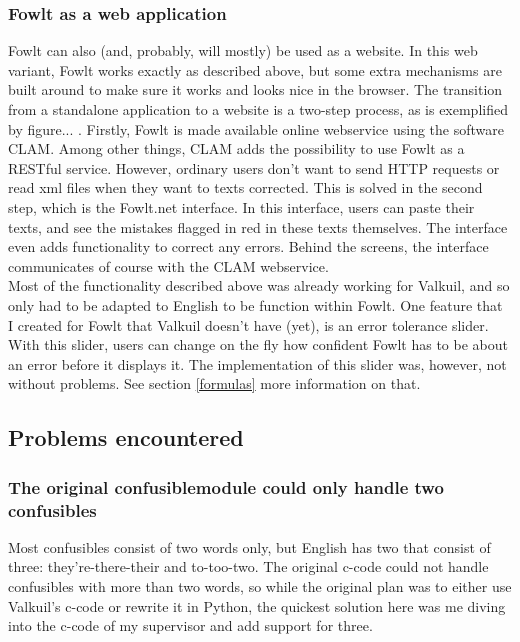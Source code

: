 \documentclass[12pt]{article}
\begin{document}
\subsubsection{Fowlt as a web application}
Fowlt can also (and, probably, will mostly) be used as a website. In this web variant, Fowlt works exactly as described above, but some extra mechanisms are built around to make sure it works and looks nice in the browser. The transition from a standalone application to a website is a two-step process, as is exemplified by figure... . Firstly, Fowlt is made available online webservice using the software CLAM. Among other things, CLAM adds the possibility to use Fowlt as a RESTful service. However, ordinary users don't want to send HTTP requests or read xml files when they want to texts corrected. This is solved in the second step, which is the Fowlt.net interface. In this interface, users can paste their texts, and see the mistakes flagged in red in these texts themselves. The interface even adds functionality to correct any errors. Behind the screens, the interface communicates of course with the CLAM webservice.
\\\indent
Most of the functionality described above was already working for Valkuil, and so only had to be adapted to English to be function within Fowlt. One feature that I created for Fowlt that Valkuil doesn't have (yet), is an error tolerance slider. With this slider, users can change on the fly how confident Fowlt has to be about an error before it displays it. The implementation of this slider was, however, not without problems. See section \ref{formulas} more information on that.

\subsection{Problems encountered}

\subsubsection{The original confusiblemodule could only handle two confusibles}
Most confusibles consist of two words only, but English has two that consist of three: they're-there-their and to-too-two. The original c-code could not handle confusibles with more than two words, so while the original plan was to either use Valkuil's c-code or rewrite it in Python, the quickest solution here was me diving into the c-code of my supervisor and add support for three.
\end{document}
